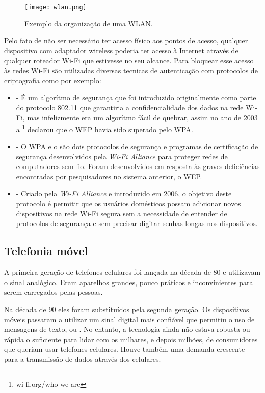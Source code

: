 \begin{figure}[!htb]
	\centering
	\texttt{[image: wlan.png]} %
	\caption[Exemplo da organização de uma WLAN]{Exemplo da organização de uma WLAN.}
	\label{fig:wlan}
\end{figure}

Pelo fato de não ser necessário ter acesso físico aos pontos de acesso, qualquer dispositivo com adaptador wireless poderia ter acesso à Internet através de qualquer roteador Wi-Fi que estivesse no seu alcance. Para bloquear esse acesso às redes Wi-Fi são utilizadas diversas tecnicas de autenticação com protocolos de criptografia como por exemplo:
\begin{itemize}
  \item {}
  - É um algorítmo de segurança que foi introduzido originalmente como parte do protocolo 802.11 que garantiria a confidencialidade dos dados na rede Wi-Fi, mas infelizmente era um algorítmo fácil de quebrar, assim no ano de 2003 a  \footnote{wi-fi.org/who-we-are} declarou que o WEP havia sido superado pelo WPA.
  \item {}
  - O WPA e o  são dois protocolos de segurança e programas de certificação de segurança desenvolvidos pela \textit{Wi-Fi Alliance} para proteger redes de computadores sem fio. Foram desenvolvidos em resposta às graves deficiências encontradas por pesquisadores no sistema anterior, o WEP.
  \item {}
  - Criado pela \textit{Wi-Fi Alliance} e introduzido em 2006, o objetivo deste protocolo é permitir que os usuários domésticos
  possam adicionar novos dispositivos na rede Wi-Fi segura sem a necessidade de entender de protocolos de segurança e sem precisar digitar senhas longas nos dispositivos.
\end{itemize}

\subsection{Telefonia móvel}
A primeira geração de telefones celulares foi lançada na década de 80 e utilizavam o sinal analógico. Eram aparelhos grandes, pouco práticos e inconvinientes para serem carregados pelas pessoas.

Na década de 90 eles foram substituídos pela segunda geração. Os dispositivos móveis passaram a utilizar um sinal digital mais confiável que permitiu o uso de mensagens de texto, ou . No entanto, a tecnologia ainda não estava robusta ou rápida o suficiente para lidar com os milhares, e depois milhões, de consumidores que queriam usar telefones celulares. Houve também uma demanda crescente para a transmissão de dados através dos celulares.


